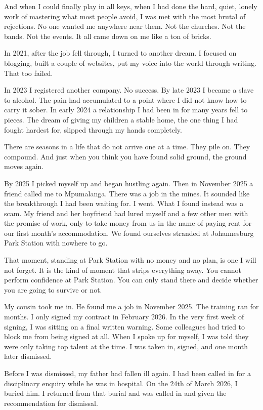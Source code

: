 And when I could finally play in all keys, when I had done the hard,
quiet, lonely work of mastering what most people avoid, I was met with
the most brutal of rejections. No one wanted me anywhere near them. Not
the churches. Not the bands. Not the events. It all came down on me like
a ton of bricks.

In 2021, after the job fell through, I turned to another dream. I
focused on blogging, built a couple of websites, put my voice into the
world through writing. That too failed.

In 2023 I registered another company. No success. By late 2023 I became
a slave to alcohol. The pain had accumulated to a point where I did not
know how to carry it sober. In early 2024 a relationship I had been in
for many years fell to pieces. The dream of giving my children a stable
home, the one thing I had fought hardest for, slipped through my hands
completely.

There are seasons in a life that do not arrive one at a time. They pile
on. They compound. And just when you think you have found solid ground,
the ground moves again.

By 2025 I picked myself up and began hustling again. Then in November
2025 a friend called me to Mpumalanga. There was a job in the mines. It
sounded like the breakthrough I had been waiting for. I went. What I
found instead was a scam. My friend and her boyfriend had lured myself
and a few other men with the promise of work, only to take money from us
in the name of paying rent for our first month's accommodation. We found
ourselves stranded at Johannesburg Park Station with nowhere to go.

That moment, standing at Park Station with no money and no plan, is one
I will not forget. It is the kind of moment that strips everything away.
You cannot perform confidence at Park Station. You can only stand there
and decide whether you are going to survive or not.

My cousin took me in. He found me a job in November 2025. The training
ran for months. I only signed my contract in February 2026. In the very
first week of signing, I was sitting on a final written warning. Some
colleagues had tried to block me from being signed at all. When I spoke
up for myself, I was told they were only taking top talent at the time.
I was taken in, signed, and one month later dismissed.

Before I was dismissed, my father had fallen ill again. I had been
called in for a disciplinary enquiry while he was in hospital. On the
24th of March 2026, I buried him. I returned from that burial and was
called in and given the recommendation for dismissal.

